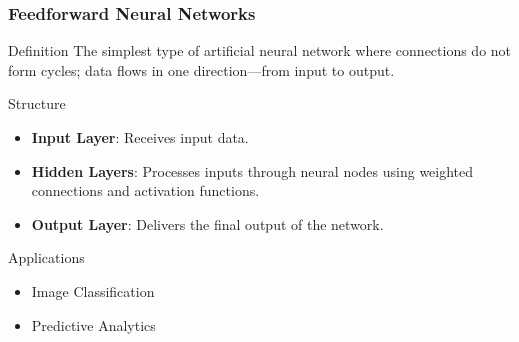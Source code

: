 \documentclass[aspectratio=169]{beamer}
\begin{document}
\begin{frame}[fragile]
    \frametitle{Feedforward Neural Networks}
    
    \begin{block}{Definition}
        The simplest type of artificial neural network where connections do not form cycles; data flows in one direction—from input to output.
    \end{block}
    
    \begin{block}{Structure}
        \begin{itemize}
            \item \textbf{Input Layer}: Receives input data.
            \item \textbf{Hidden Layers}: Processes inputs through neural nodes using weighted connections and activation functions.
            \item \textbf{Output Layer}: Delivers the final output of the network.
        \end{itemize}
    \end{block}

    \begin{block}{Applications}
        \begin{itemize}
            \item Image Classification
            \item Predictive Analytics
        \end{itemize}
    \end{block}
    
\end{frame}
\end{document}
